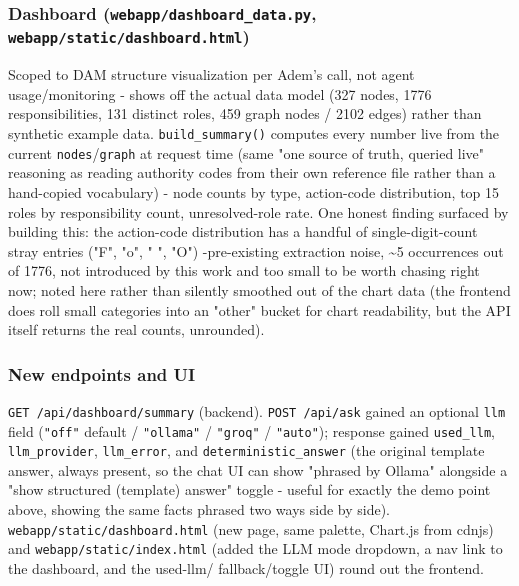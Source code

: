 \subsubsection*{Dashboard (\texttt{webapp/\allowbreak{}dashboard\_\allowbreak{}data.py}, \texttt{webapp/\allowbreak{}static/\allowbreak{}dashboard.html})}
Scoped to DAM structure visualization per Adem's call, not agent usage/monitoring - shows off the actual data model (327 nodes, 1776 responsibilities, 131 distinct roles, 459 graph nodes / 2102 edges) rather than synthetic example data. \texttt{build\_\allowbreak{}summary()} computes every number live from the current \texttt{nodes}/\texttt{graph} at request time (same "one source of truth, queried live" reasoning as reading authority codes from their own reference file rather than a hand-copied vocabulary) - node counts by type, action-code distribution, top 15 roles by responsibility count, unresolved-role rate. One honest finding surfaced by building this: the action-code distribution has a handful of single-digit-count stray entries ("F", "o", " ", "O") -pre-existing extraction noise, \textasciitilde{}5 occurrences out of 1776, not introduced by this work and too small to be worth chasing right now; noted here rather than silently smoothed out of the chart data (the frontend does roll small categories into an "other" bucket for chart readability, but the API itself returns the real counts, unrounded).

\subsubsection*{New endpoints and UI}
\texttt{GET /\allowbreak{}api/\allowbreak{}dashboard/\allowbreak{}summary} (backend). \texttt{POST /\allowbreak{}api/\allowbreak{}ask} gained an optional \texttt{llm} field (\texttt{"off"} default / \texttt{"ollama"} / \texttt{"groq"} / \texttt{"auto"}); response gained \texttt{used\_\allowbreak{}llm}, \texttt{llm\_\allowbreak{}provider}, \texttt{llm\_\allowbreak{}error}, and \texttt{deterministic\_\allowbreak{}answer} (the original template answer, always present, so the chat UI can show "phrased by Ollama" alongside a "show structured (template) answer" toggle - useful for exactly the demo point above, showing the same facts phrased two ways side by side). \texttt{webapp/\allowbreak{}static/\allowbreak{}dashboard.html} (new page, same palette, Chart.js from cdnjs) and \texttt{webapp/\allowbreak{}static/\allowbreak{}index.html} (added the LLM mode dropdown, a nav link to the dashboard, and the used-llm/ fallback/toggle UI) round out the frontend.

